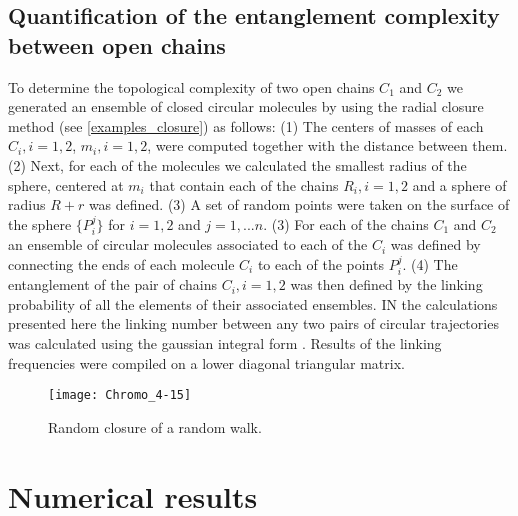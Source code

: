 \documentclass{iopart}
\begin{document}
\subsection{Quantification of the entanglement complexity between open chains}
To determine the topological complexity of two open chains $C_1$ and $C_2$ we generated an ensemble of closed circular molecules by using the radial closure method  \cite{Millet2013} (see \ref{examples_closure}) as follows: (1) The centers of masses of each $C_i,i=1,2$, $m_i, i=1,2$, were computed together with the distance between them. (2) Next, for each of the molecules we calculated the smallest radius of the sphere, centered at $m_i$ that contain each of the chains  $R_i,i=1,2$ and a sphere of radius $R+r$ was defined. (3) A set of random points were taken on the surface of the sphere $\{P_i^j\}$ for $i=1,2$ and $j=1,...n$. (3) For each of the chains $C_1$ and $C_2$ an ensemble of circular molecules associated to each of the $C_i$ was defined by connecting the ends of each molecule $C_i$ to each of the points $P_i^j$. (4) The entanglement of the pair of chains $C_i,i=1,2$ was then defined by the linking probability of all the elements of their associated ensembles. IN the calculations presented here the linking number between any two pairs of circular trajectories was  calculated using the gaussian integral form \cite{KL2000}. Results of the linking frequencies were compiled on a lower diagonal triangular matrix. 


\begin{figure}[!htb]
\begin{center}
\texttt{[image: Chromo\_4-15]}
\end{center}
\caption{Random closure of a random walk.
\label{RandomClosure}}
\end{figure}


\medskip


\medskip

\medskip
\section{Numerical results}
\end{document}
